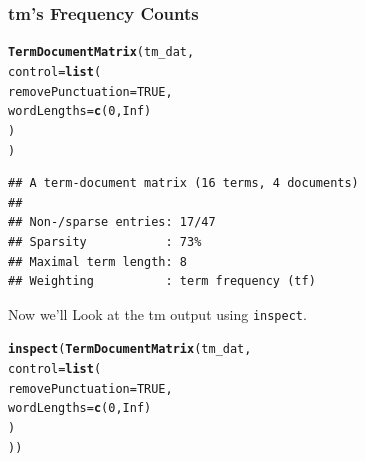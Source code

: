 \documentclass{article}\usepackage[]{graphicx}\usepackage[]{color}
\makeatletter
\newcommand{\hlnum}[1]{\textcolor[rgb]{0.686,0.059,0.569}{#1}}%
\newcommand{\hlstd}[1]{\textcolor[rgb]{0.345,0.345,0.345}{#1}}%
\newcommand{\hlkwc}[1]{\textcolor[rgb]{0.333,0.667,0.333}{#1}}%
\newcommand{\hlkwd}[1]{\textcolor[rgb]{0.737,0.353,0.396}{\textbf{#1}}}%
\newenvironment{kframe}{%
 \def\at@end@of@kframe{}%
 \ifinner\ifhmode%
  \def\at@end@of@kframe{\end{minipage}}%
  \begin{minipage}{\columnwidth}%
 \fi\fi%
 \def\FrameCommand##1{\hskip\@totalleftmargin \hskip-\fboxsep
 \colorbox{shadecolor}{##1}\hskip-\fboxsep
     \hskip-\linewidth \hskip-\@totalleftmargin \hskip\columnwidth}%
 \MakeFramed {\advance\hsize-\width
   \@totalleftmargin\z@ \linewidth\hsize
   \@setminipage}}%
 {\par\unskip\endMakeFramed%
 \at@end@of@kframe}
\newenvironment{knitrout}{}{} %
\makeatother
\begin{document}
\subsubsection{tm's Frequency Counts}

\begin{knitrout}
\color{fgcolor}\begin{kframe}
\begin{alltt}
\hlkwd{TermDocumentMatrix}\hlstd{(tm_dat,}
    \hlkwc{control} \hlstd{=} \hlkwd{list}\hlstd{(}
        \hlkwc{removePunctuation} \hlstd{=} \hlnum{TRUE}\hlstd{,}
        \hlkwc{wordLengths}\hlstd{=}\hlkwd{c}\hlstd{(}\hlnum{0}\hlstd{,} \hlnum{Inf}\hlstd{)}
    \hlstd{)}
\hlstd{)}
\end{alltt}
\end{kframe}
\end{knitrout}


\begin{knitrout}
\color{fgcolor}\begin{kframe}
\begin{verbatim}
## A term-document matrix (16 terms, 4 documents)
## 
## Non-/sparse entries: 17/47
## Sparsity           : 73%
## Maximal term length: 8 
## Weighting          : term frequency (tf)
\end{verbatim}
\end{kframe}
\end{knitrout}


\noindent Now we'll Look at the tm output using \texttt{inspect}.

\begin{knitrout}
\color{fgcolor}\begin{kframe}
\begin{alltt}
\hlkwd{inspect}\hlstd{(}\hlkwd{TermDocumentMatrix}\hlstd{(tm_dat,}
    \hlkwc{control} \hlstd{=} \hlkwd{list}\hlstd{(}
        \hlkwc{removePunctuation} \hlstd{=} \hlnum{TRUE}\hlstd{,}
        \hlkwc{wordLengths}\hlstd{=}\hlkwd{c}\hlstd{(}\hlnum{0}\hlstd{,} \hlnum{Inf}\hlstd{)}
    \hlstd{)}
\hlstd{))}
\end{alltt}
\end{kframe}
\end{knitrout}
\end{document}
